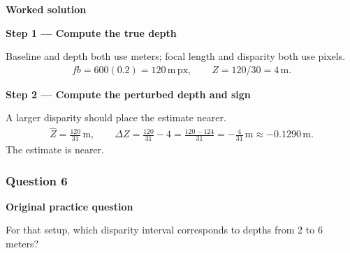 \documentclass[letterpaper,11pt,english,openany,oneside]{jupyterBook}
\begin{document}
\par\medskip
\textbf{Worked solution}\par\smallskip

\par\medskip{}
{\color{QuizStepRed}\bfseries Step 1 — Compute the true depth}\par\smallskip

\sphinxAtStartPar
{} Baseline and depth both use meters; focal length and disparity both use pixels.
{\color{QuizMathBlue} \begin{equation*}
\begin{split}
fb=600(0.2)=120\,\mathrm{m\,px},\qquad Z=120/30=4\,\mathrm m.
\end{split}
\end{equation*}}
\par

\par\medskip{}
{\color{QuizStepRed}\bfseries Step 2 — Compute the perturbed depth and sign}\par\smallskip

\sphinxAtStartPar
{} A larger disparity should place the estimate nearer.
{\color{QuizMathBlue} \begin{equation*}
\begin{split}
\widehat Z=\frac{120}{31}\,\mathrm m,\qquad\Delta Z=\frac{120}{31}-4=\frac{120-124}{31}=-\frac4{31}\,\mathrm m\approx-0.1290\,\mathrm m.
\end{split}
\end{equation*}}
\sphinxAtStartPar
The estimate is nearer.

\par

\par\medskip


\subsubsection{Question 6}
\label{\detokenize{lectures/lecture04/tldr:question-6}}\label{\detokenize{lectures/lecture04/tldr:lec04-tldr-q6}}
\par\medskip\textbf{Original practice question}\par\smallskip

\sphinxAtStartPar
For that setup, which disparity interval corresponds to depths from 2 to 6 meters?

\par\medskip
\end{document}
